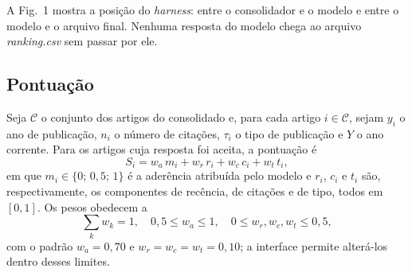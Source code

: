 \documentclass[10pt,a4paper,twocolumn]{article}
\newcommand{\cod}[1]{\textit{#1}}
\begin{document}
A Fig.~1 mostra a posição do \emph{harness}: entre o consolidador e o modelo e entre o modelo e o arquivo final. Nenhuma resposta do modelo chega ao arquivo \cod{ranking.csv} sem passar por ele.

\subsection{Pontuação}

Seja $\mathcal{C}$ o conjunto dos artigos do consolidado e, para cada artigo $i \in \mathcal{C}$, sejam $y_i$ o ano de publicação, $n_i$ o número de citações, $\tau_i$ o tipo de publicação e $Y$ o ano corrente. Para os artigos cuja resposta foi aceita, a pontuação é
\begin{equation}
  S_i = w_a\,m_i + w_r\,r_i + w_c\,c_i + w_t\,t_i ,
\end{equation}
em que $m_i \in \{0;\,0{,}5;\,1\}$ é a aderência atribuída pelo modelo e $r_i$, $c_i$ e $t_i$ são, respectivamente, os componentes de recência, de citações e de tipo, todos em $[0,1]$. Os pesos obedecem a
\begin{equation}
  \textstyle\sum_k w_k = 1, \quad 0{,}5 \le w_a \le 1, \quad 0 \le w_r, w_c, w_t \le 0{,}5 ,
\end{equation}
com o padrão $w_a = 0{,}70$ e $w_r = w_c = w_t = 0{,}10$; a interface permite alterá-los dentro desses limites.
\end{document}
